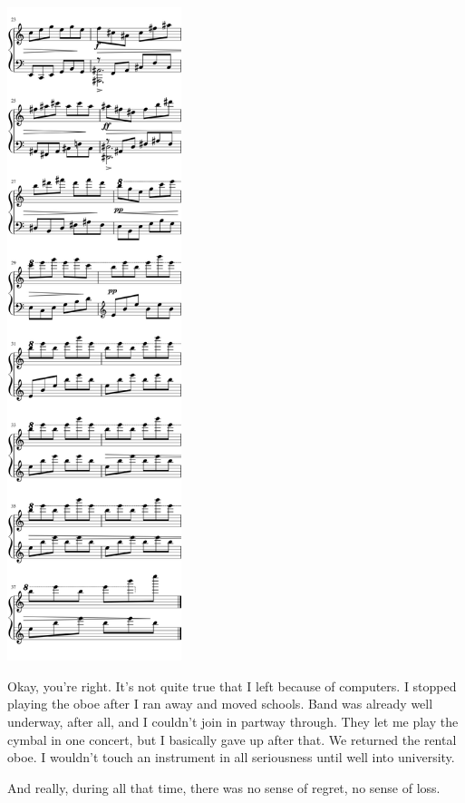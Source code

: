 \begin{paracol}{2}
\begin{rightcolumn*}
\begin{flushright}
\noindent\includegraphics[width=2in]{assets/static/miniatures/2-2.png}
\end{flushright}
\end{rightcolumn*}
\begin{leftcolumn}

\noindent Okay, you're right. It's not quite true that I left because of computers. I stopped playing the oboe after I ran away and moved schools. Band was already well underway, after all, and I couldn't join in partway through. They let me play the cymbal in one concert, but I basically gave up after that. We returned the rental oboe. I wouldn't touch an instrument in all seriousness until well into university.

And really, during all that time, there was no sense of regret, no sense of loss.


\end{leftcolumn}
\end{paracol}
